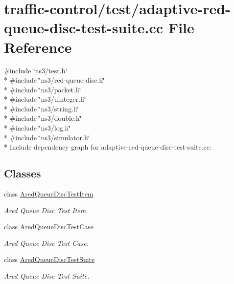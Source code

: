 \hypertarget{adaptive-red-queue-disc-test-suite_8cc}{}\section{traffic-\/control/test/adaptive-\/red-\/queue-\/disc-\/test-\/suite.cc File Reference}
\label{adaptive-red-queue-disc-test-suite_8cc}
{\ttfamily \#include \char`\"{}ns3/test.\+h\char`\"{}}\\*
{\ttfamily \#include \char`\"{}ns3/red-\/queue-\/disc.\+h\char`\"{}}\\*
{\ttfamily \#include \char`\"{}ns3/packet.\+h\char`\"{}}\\*
{\ttfamily \#include \char`\"{}ns3/uinteger.\+h\char`\"{}}\\*
{\ttfamily \#include \char`\"{}ns3/string.\+h\char`\"{}}\\*
{\ttfamily \#include \char`\"{}ns3/double.\+h\char`\"{}}\\*
{\ttfamily \#include \char`\"{}ns3/log.\+h\char`\"{}}\\*
{\ttfamily \#include \char`\"{}ns3/simulator.\+h\char`\"{}}\\*
Include dependency graph for adaptive-\/red-\/queue-\/disc-\/test-\/suite.cc\+:
\subsection*{Classes}
\begin{DoxyCompactItemize}
\item 
class \hyperlink{classAredQueueDiscTestItem}{Ared\+Queue\+Disc\+Test\+Item}
\begin{DoxyCompactList}\small\item\em Ared Queue Disc Test Item. \end{DoxyCompactList}\item 
class \hyperlink{classAredQueueDiscTestCase}{Ared\+Queue\+Disc\+Test\+Case}
\begin{DoxyCompactList}\small\item\em Ared Queue Disc Test Case. \end{DoxyCompactList}\item 
class \hyperlink{classAredQueueDiscTestSuite}{Ared\+Queue\+Disc\+Test\+Suite}
\begin{DoxyCompactList}\small\item\em Ared Queue Disc Test Suite. \end{DoxyCompactList}\end{DoxyCompactItemize}
